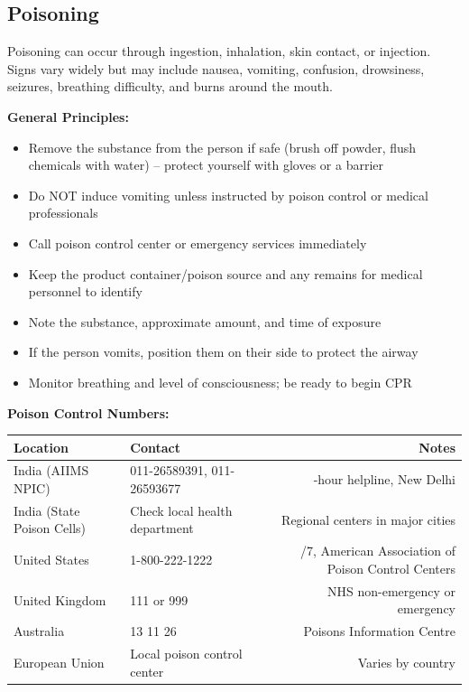 \subsection{Poisoning}

Poisoning can occur through ingestion, inhalation, skin contact, or injection. Signs vary widely but may include nausea, vomiting, confusion, drowsiness, seizures, breathing difficulty, and burns around the mouth.

\textbf{General Principles:}

\begin{itemize}
  \item Remove the substance from the person if safe (brush off powder, flush chemicals with water) -- protect yourself with gloves or a barrier
  \item Do NOT induce vomiting unless instructed by poison control or medical professionals
  \item Call poison control center or emergency services immediately
  \item Keep the product container/poison source and any remains for medical personnel to identify
  \item Note the substance, approximate amount, and time of exposure
  \item If the person vomits, position them on their side to protect the airway
  \item Monitor breathing and level of consciousness; be ready to begin CPR
\end{itemize}

\textbf{Poison Control Numbers:}

\begin{center}
\small
\begin{tabularx}{\textwidth}{@{}>{\raggedright\arraybackslash}lX>{\raggedright\arraybackslash}r@{}}
\hline
\textbf{Location} & \textbf{Contact} & \textbf{Notes} \\
\hline
India (AIIMS NPIC) & 011-26589391, 011-26593677 & 24-hour helpline, New Delhi \\
India (State Poison Cells) & Check local health department & Regional centers in major cities \\
United States & 1-800-222-1222 & 24/7, American Association of Poison Control Centers \\
United Kingdom & 111 or 999 & NHS non-emergency or emergency \\
Australia & 13 11 26 & Poisons Information Centre \\
European Union & Local poison control center & Varies by country \\
\hline
\end{tabularx}
\end{center}

